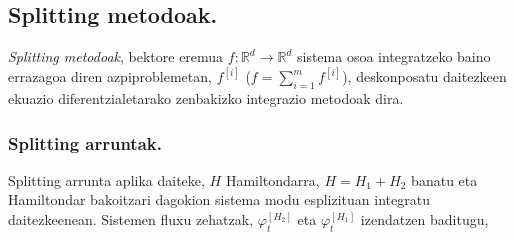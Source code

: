 \subsection{Splitting metodoak.}

\emph{Splitting metodoak}, bektore eremua $f: \mathbb{R}^d \rightarrow \mathbb{R}^d$ sistema osoa integratzeko baino errazagoa diren azpiproblemetan, $f^{[i]}$ ($f=\sum\limits_{i=1}^{m} f^{[i]}$), deskonposatu daitezkeen ekuazio diferentzialetarako zenbakizko integrazio metodoak dira.  

\subsubsection*{Splitting arruntak.}

Splitting arrunta aplika daiteke, $H$ Hamiltondarra, $H=H_1+H_2$ banatu eta Hamiltondar bakoitzari dagokion sistema modu esplizituan integratu daitezkeenean. Sistemen fluxu zehatzak, $\varphi_t^{[H_2]}$ eta $\varphi_t^{[H_1]}$ izendatzen baditugu,    

